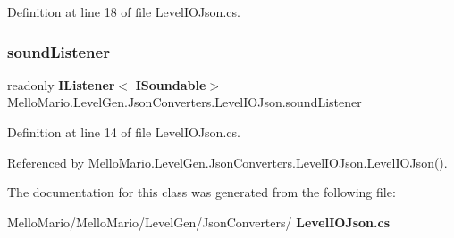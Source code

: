 Definition at line 18 of file Level\+I\+O\+Json.\+cs.

\mbox{\label{classMelloMario_1_1LevelGen_1_1JsonConverters_1_1LevelIOJson_adfd4808eb49eb5b4ae2a26ccaca547a3}} 
\subsubsection{sound\+Listener}
{\footnotesize\ttfamily readonly \textbf{ I\+Listener}$<$\textbf{ I\+Soundable}$>$ Mello\+Mario.\+Level\+Gen.\+Json\+Converters.\+Level\+I\+O\+Json.\+sound\+Listener\hspace{0.3cm}{\ttfamily [private]}}



Definition at line 14 of file Level\+I\+O\+Json.\+cs.



Referenced by Mello\+Mario.\+Level\+Gen.\+Json\+Converters.\+Level\+I\+O\+Json.\+Level\+I\+O\+Json().



The documentation for this class was generated from the following file\+:\begin{DoxyCompactItemize}
\item 
Mello\+Mario/\+Mello\+Mario/\+Level\+Gen/\+Json\+Converters/\textbf{ Level\+I\+O\+Json.\+cs}\end{DoxyCompactItemize}
